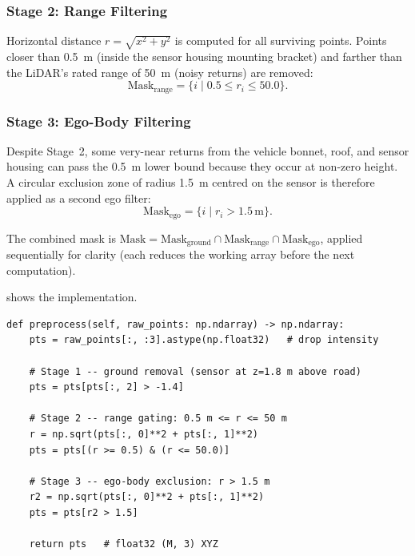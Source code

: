 \documentclass[12pt,a4paper]{article}
\begin{document}
\subsubsection{Stage 2: Range Filtering}

Horizontal distance $r = \sqrt{x^2 + y^2}$ is computed for all surviving
points.  Points closer than \SI{0.5}{\metre} (inside the sensor housing
mounting bracket) and farther than the LiDAR's rated range of \SI{50}{\metre}
(noisy returns) are removed:
\begin{equation}
  \text{Mask}_{\text{range}} = \bigl\{ i \;\big|\; 0.5 \le r_i \le 50.0 \bigr\}.
  \label{eq:range_mask}
\end{equation}

\subsubsection{Stage 3: Ego-Body Filtering}

Despite Stage~2, some very-near returns from the vehicle bonnet, roof, and
sensor housing can pass the \SI{0.5}{\metre} lower bound because they occur at
non-zero height.  A circular exclusion zone of radius \SI{1.5}{\metre} centred
on the sensor is therefore applied as a second ego filter:
\begin{equation}
  \text{Mask}_{\text{ego}} = \bigl\{ i \;\big|\; r_i > 1.5\,\text{m} \bigr\}.
  \label{eq:ego_mask}
\end{equation}

The combined mask is $\text{Mask} = \text{Mask}_{\text{ground}} \cap
\text{Mask}_{\text{range}} \cap \text{Mask}_{\text{ego}}$, applied sequentially
for clarity (each reduces the working array before the next computation).

 shows the implementation.

\begin{lstlisting}[caption={Point-cloud preprocessing (\texttt{LidarProcessor.preprocess}).},
                   label={lst:ground_removal}]
def preprocess(self, raw_points: np.ndarray) -> np.ndarray:
    pts = raw_points[:, :3].astype(np.float32)   # drop intensity

    # Stage 1 -- ground removal (sensor at z=1.8 m above road)
    pts = pts[pts[:, 2] > -1.4]

    # Stage 2 -- range gating: 0.5 m <= r <= 50 m
    r = np.sqrt(pts[:, 0]**2 + pts[:, 1]**2)
    pts = pts[(r >= 0.5) & (r <= 50.0)]

    # Stage 3 -- ego-body exclusion: r > 1.5 m
    r2 = np.sqrt(pts[:, 0]**2 + pts[:, 1]**2)
    pts = pts[r2 > 1.5]

    return pts   # float32 (M, 3) XYZ
\end{lstlisting}
\end{document}
